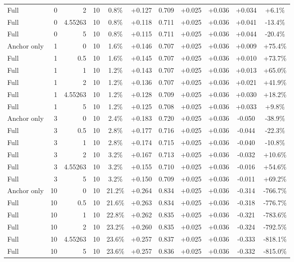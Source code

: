 \begin{table}[htbp]
\begin{tabular}{lrrrccccccc}
Full & 0 & 2 & 10 & 0.8\% & +0.127 & 0.709 & +0.025 & +0.036 & +0.034 & +6.1\% \\
Full & 0 & 4.55263 & 10 & 0.8\% & +0.118 & 0.711 & +0.025 & +0.036 & +0.041 & -13.4\% \\
Full & 0 & 5 & 10 & 0.8\% & +0.115 & 0.711 & +0.025 & +0.036 & +0.044 & -20.4\% \\
Anchor only & 1 & 0 & 10 & 1.6\% & +0.146 & 0.707 & +0.025 & +0.036 & +0.009 & +75.4\% \\
Full & 1 & 0.5 & 10 & 1.6\% & +0.145 & 0.707 & +0.025 & +0.036 & +0.010 & +73.7\% \\
Full & 1 & 1 & 10 & 1.2\% & +0.143 & 0.707 & +0.025 & +0.036 & +0.013 & +65.0\% \\
Full & 1 & 2 & 10 & 1.2\% & +0.136 & 0.707 & +0.025 & +0.036 & +0.021 & +41.9\% \\
Full & 1 & 4.55263 & 10 & 1.2\% & +0.128 & 0.709 & +0.025 & +0.036 & +0.030 & +18.2\% \\
Full & 1 & 5 & 10 & 1.2\% & +0.125 & 0.708 & +0.025 & +0.036 & +0.033 & +9.8\% \\
Anchor only & 3 & 0 & 10 & 2.4\% & +0.183 & 0.720 & +0.025 & +0.036 & -0.050 & -38.9\% \\
Full & 3 & 0.5 & 10 & 2.8\% & +0.177 & 0.716 & +0.025 & +0.036 & -0.044 & -22.3\% \\
Full & 3 & 1 & 10 & 2.8\% & +0.174 & 0.715 & +0.025 & +0.036 & -0.040 & -10.8\% \\
Full & 3 & 2 & 10 & 3.2\% & +0.167 & 0.713 & +0.025 & +0.036 & -0.032 & +10.6\% \\
Full & 3 & 4.55263 & 10 & 3.2\% & +0.155 & 0.710 & +0.025 & +0.036 & -0.016 & +54.6\% \\
Full & 3 & 5 & 10 & 3.2\% & +0.150 & 0.709 & +0.025 & +0.036 & -0.011 & +69.2\% \\
Anchor only & 10 & 0 & 10 & 21.2\% & +0.264 & 0.834 & +0.025 & +0.036 & -0.314 & -766.7\% \\
Full & 10 & 0.5 & 10 & 21.6\% & +0.263 & 0.834 & +0.025 & +0.036 & -0.318 & -776.7\% \\
Full & 10 & 1 & 10 & 22.8\% & +0.262 & 0.835 & +0.025 & +0.036 & -0.321 & -783.6\% \\
Full & 10 & 2 & 10 & 23.2\% & +0.260 & 0.835 & +0.025 & +0.036 & -0.324 & -792.5\% \\
Full & 10 & 4.55263 & 10 & 23.6\% & +0.257 & 0.837 & +0.025 & +0.036 & -0.333 & -818.1\% \\
Full & 10 & 5 & 10 & 23.6\% & +0.257 & 0.836 & +0.025 & +0.036 & -0.332 & -815.0\% \\

\end{tabular}
\end{table}
